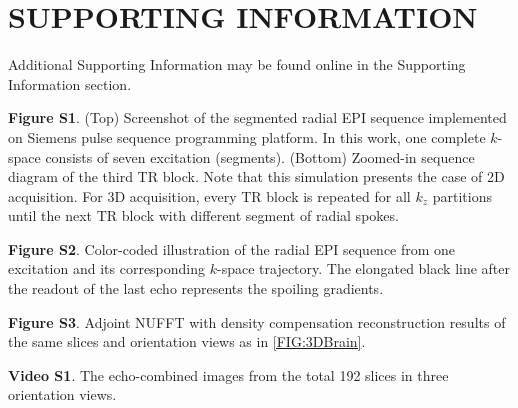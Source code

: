 \documentclass[a4paper,11pt]{article}
\begin{document}
\pagebreak

\section*{SUPPORTING INFORMATION}

Additional Supporting Information may be found online in
the Supporting Information section.

\vspace{2em}

\noindent \textbf{Figure S1}. (Top) Screenshot of the segmented radial EPI sequence
implemented on Siemens pulse sequence programming platform. In this work, one complete
$k$-space consists of seven excitation (segments).
(Bottom) Zoomed-in sequence diagram of the third TR block.
Note that this simulation presents the case of 2D acquisition.
For 3D acquisition, every TR block is repeated for all $k_z$ partitions
until the next TR block with different segment of radial spokes.

\vspace{2em}

\noindent \textbf{Figure S2}. Color-coded illustration of the radial EPI sequence
from one excitation and its corresponding $k$-space trajectory.
The elongated black line after the readout of the last echo
represents the spoiling gradients.

\vspace{2em}

\noindent \textbf{Figure S3}. Adjoint NUFFT with density compensation
reconstruction results of the same slices and orientation views
as in \cref{FIG:3DBrain}.

\vspace{2em}

\noindent \textbf{Video S1}. The echo-combined images from the total 192 slices in three orientation views.
\end{document}
